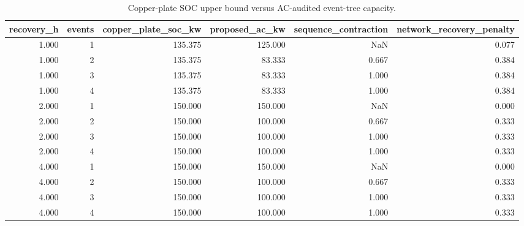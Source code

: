 \begin{table}
\caption{Copper-plate SOC upper bound versus AC-audited event-tree capacity.}
\label{tab:baseline}
\begin{tabular}{rrrrrr}
\toprule
recovery_h & events & copper_plate_soc_kw & proposed_ac_kw & sequence_contraction & network_recovery_penalty \\
\midrule
1.000 & 1 & 135.375 & 125.000 & NaN & 0.077 \\
1.000 & 2 & 135.375 & 83.333 & 0.667 & 0.384 \\
1.000 & 3 & 135.375 & 83.333 & 1.000 & 0.384 \\
1.000 & 4 & 135.375 & 83.333 & 1.000 & 0.384 \\
2.000 & 1 & 150.000 & 150.000 & NaN & 0.000 \\
2.000 & 2 & 150.000 & 100.000 & 0.667 & 0.333 \\
2.000 & 3 & 150.000 & 100.000 & 1.000 & 0.333 \\
2.000 & 4 & 150.000 & 100.000 & 1.000 & 0.333 \\
4.000 & 1 & 150.000 & 150.000 & NaN & 0.000 \\
4.000 & 2 & 150.000 & 100.000 & 0.667 & 0.333 \\
4.000 & 3 & 150.000 & 100.000 & 1.000 & 0.333 \\
4.000 & 4 & 150.000 & 100.000 & 1.000 & 0.333 \\
\bottomrule
\end{tabular}
\end{table}
